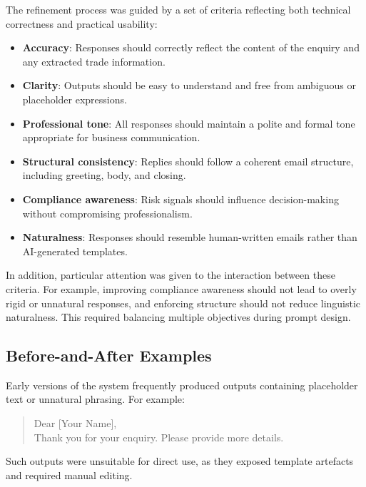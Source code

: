 \documentclass[12pt,a4paper]{report}
\begin{document}
The refinement process was guided by a set of criteria reflecting both technical correctness and practical usability:

\begin{itemize}
    \item \textbf{Accuracy}: Responses should correctly reflect the content of the enquiry and any extracted trade information.
    
    \item \textbf{Clarity}: Outputs should be easy to understand and free from ambiguous or placeholder expressions.
    
    \item \textbf{Professional tone}: All responses should maintain a polite and formal tone appropriate for business communication.
    
    \item \textbf{Structural consistency}: Replies should follow a coherent email structure, including greeting, body, and closing.
    
    \item \textbf{Compliance awareness}: Risk signals should influence decision-making without compromising professionalism.
    
    \item \textbf{Naturalness}: Responses should resemble human-written emails rather than AI-generated templates.
\end{itemize}

In addition, particular attention was given to the interaction between these criteria. For example, improving compliance awareness should not lead to overly rigid or unnatural responses, and enforcing structure should not reduce linguistic naturalness. This required balancing multiple objectives during prompt design.

\subsection{Before-and-After Examples}

Early versions of the system frequently produced outputs containing placeholder text or unnatural phrasing. For example:

\begin{quote}
Dear [Your Name], \\
Thank you for your enquiry. Please provide more details.
\end{quote}

Such outputs were unsuitable for direct use, as they exposed template artefacts and required manual editing.
\end{document}
